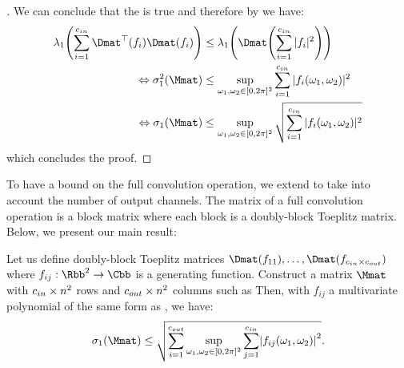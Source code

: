 \begin{proof}[]
\noindent
We can conclude that the  is true and therefore by  we have:
\begin{align}
  \lambda_1 \left( \sum_{i=1}^{\cin} \Dmat^{\top} \left(f_i \right) \Dmat (f_i) \right) &\leq \lambda_1 \left( \Dmat \left( \sum_{i=1}^{\cin} |f_i|^2 \right) \right) \\
  \Leftrightarrow \sigma_1^2 \left( \Mmat \right) &\leq \sup_{\omega_1, \omega_2 \in [0, 2\pi]^2} \sum_{i=1}^{\cin} |f_i(\omega_1, \omega_2)|^2 \\
  \Leftrightarrow \sigma_1 \left( \Mmat \right) &\leq \sup_{\omega_1, \omega_2 \in [0, 2\pi]^2} \sqrt{ \sum_{i=1}^{\cin} |f_i(\omega_1, \omega_2)|^2 }
\end{align}
which concludes the proof. 
\end{proof}

\endgroup

\pagebreak

To have a bound on the full convolution operation, we extend  to take into account the number of output channels.
The matrix of a full convolution operation is a block matrix where each block is a doubly-block Toeplitz matrix.
Below, we present our main result:

\begin{maintheorem} \label{theorem:ch5-bound_max_sv_convolution} 
  Let us define doubly-block Toeplitz matrices $\Dmat(f_{11}), \dots, \Dmat(f_{\cin\times \cout})$ where $f_{ij}: \Rbb^2 \rightarrow \Cbb$ is a generating function. Construct a matrix $\Mmat$ with $c_{in}\times n^2$ rows and $c_{out}\times n^2$ columns such as
  Then, with $f_{ij}$ a multivariate polynomial of the same form as , we have:
  \begin{equation} \label{equation:lipbound_sv}
     \sigma_1 \left( \Mmat \right) \leq \sqrt{ \sum_{i=1}^{\cout} \sup_{\omega_1, \omega_2 \in [0, 2\pi]^2} \sum_{j = 1}^{\cin} \left|f_{ij}(\omega_1, \omega_2) \right|^2 } .
  \end{equation} 
  \removespace
\end{maintheorem}

